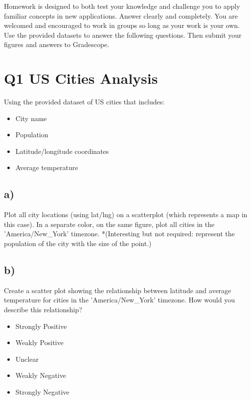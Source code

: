 \documentclass[12pt]{article}
\begin{document}
Homework is designed to both test your knowledge and challenge you to apply familiar concepts in new applications. Answer clearly and completely. You are welcomed and encouraged to work in groups so long as your work is your own. Use the provided datasets to answer the following questions. Then submit your figures and answers to Gradescope.

\section{Q1 US Cities Analysis}
Using the provided dataset of US cities that includes:

\begin{itemize}
    \item City name
    \item Population
    \item Latitude/longitude coordinates
    \item Average temperature
\end{itemize}

\subsection*{a)}
Plot all city locations (using lat/lng) on a scatterplot (which represents a map in this case). In a separate color, on the same figure, plot all cities in the 'America/New\_York' timezone. *(Interesting but not required: represent the population of the city with the size of the point.)

\subsection*{b)} Create a scatter plot showing the relationship between latitude and average temperature for cities in the 'America/New\_York' timezone. How would you describe this relationship?

\begin{itemize}
    \item Strongly Positive
    \item Weakly Positive
    \item Unclear
    \item Weakly Negative
    \item Strongly Negative
\end{itemize}
\end{document}
